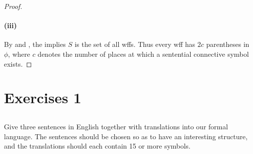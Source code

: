 \documentclass{report}
\begin{document}
\begin{proof}
    \paragraph{(iii)}%

      By  and
        , the
         implies $S$ is the set of all wffs.
      Thus every wff has $2c$ parentheses in $\phi$, where $c$ denotes the
        number of places at which a sentential connective symbol exists.

  \end{proof}

\section{Exercises 1}%

\subsection{}%

  Give three sentences in English together with translations into our formal
    language.
  The sentences should be chosen so as to have an interesting structure, and the
    translations should each contain 15 or more symbols.
\end{document}
